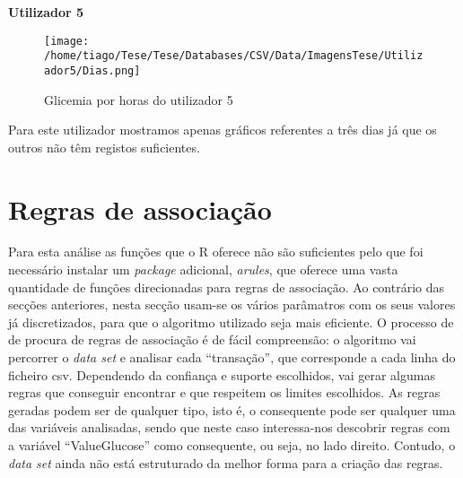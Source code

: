 \textbf{Utilizador 5}

\begin{figure}[H]
\centering
\texttt{[image: /home/tiago/Tese/Tese/Databases/CSV/Data/ImagensTese/Utilizador5/Dias.png]}
\caption{Glicemia por horas do utilizador 5}
\end{figure}

Para este utilizador mostramos apenas gráficos referentes a três dias já que os outros não têm registos suficientes.



\section{Regras de associação}

Para esta análise as funções que o R oferece não são suficientes pelo que foi necessário instalar um \textit{package} adicional, \textit{arules}, que oferece uma vasta quantidade de funções direcionadas para regras de associação. Ao contrário das secções anteriores, nesta secção usam-se os vários parâmatros com os seus valores já discretizados, para que o algoritmo utilizado seja mais eficiente. O processo de de procura de regras de associação é de fácil compreensão: o algoritmo vai percorrer o \textit{data set} e analisar cada ``transação'', que corresponde a cada linha do ficheiro csv. Dependendo da confiança e suporte escolhidos, vai gerar algumas regras que conseguir encontrar e que respeitem os limites escolhidos. As regras geradas podem ser de qualquer tipo, isto é, o consequente pode ser qualquer uma das variáveis analisadas, sendo que neste caso interessa-nos descobrir regras com a variável ``Value\textunderscore Glucose'' como consequente, ou seja, no lado direito. Contudo, o \textit{data set} ainda não está estruturado da melhor forma para a criação das regras. 
